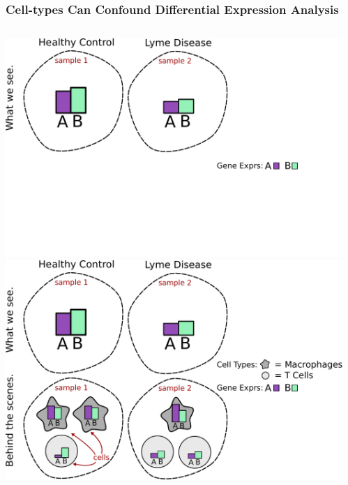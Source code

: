 \documentclass[usenames,dvipsnames,15pt,handout]{beamer}
\begin{document}
\begin{frame}
  \frametitle{Cell-types Can Confound Differential Expression Analysis}
  \begin{columns}
    \begin{column}{.6\textwidth}
  \begin{center}\begin{minipage}{\columnwidth}
    \centering
    \begin{overprint}
      \includegraphics[scale=.38]{pictures/confound}
      \includegraphics[scale=.38]{pictures/confound2}
    \end{overprint}
  \end{minipage}
  \end{center}
    \end{column}
    \begin{column}{.4\textwidth}\vspace{-1.7cm}


\end{column}
\end{columns}
\end{frame}
\end{document}
